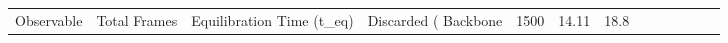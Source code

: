 \begin{tabular}{lrllrllllllll}
\toprule
Observable & Total Frames & Equilibration Time (t_eq) & Discarded (%
\midrule
Backbone & 1500 & 14.11 & 18.8%
\bottomrule
\end{tabular}
